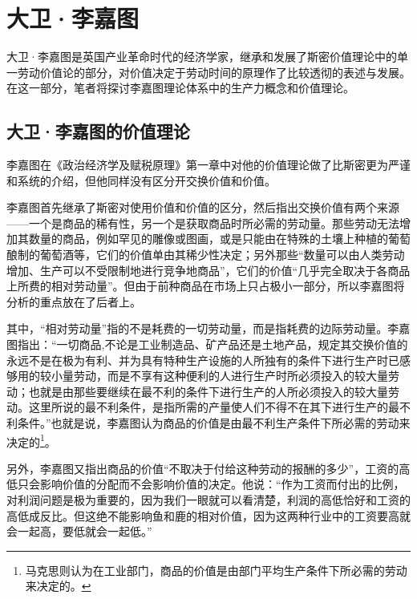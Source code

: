 \section{大卫·李嘉图}

大卫·李嘉图是英国产业革命时代的经济学家，继承和发展了斯密价值理论中的单一劳动价值论的部分，对价值决定于劳动时间的原理作了比较透彻的表述与发展\cite[iv]{DaWei*LiJiaTuZhengZhiJingJiXueJiFuShuiYuanLi2021}。在这一部分，笔者将探讨李嘉图理论体系中的生产力概念和价值理论。

\subsection{大卫·李嘉图的价值理论}

李嘉图在《政治经济学及赋税原理》第一章中对他的价值理论做了比斯密更为严谨和系统的介绍，但他同样没有区分开交换价值和价值。

李嘉图首先继承了斯密对使用价值和价值的区分，然后指出交换价值有两个来源——一个是商品的稀有性，另一个是获取商品时所必需的劳动量\cite[5-6]{DaWei*LiJiaTuZhengZhiJingJiXueJiFuShuiYuanLi2021}。那些劳动无法增加其数量的商品，例如罕见的雕像或图画，或是只能由在特殊的土壤上种植的葡萄酿制的葡萄酒等，它们的价值单由其稀少性决定；另外那些“数量可以由人类劳动增加、生产可以不受限制地进行竞争地商品”，它们的价值“几乎完全取决于各商品上所费的相对劳动量”。\cite[6]{DaWei*LiJiaTuZhengZhiJingJiXueJiFuShuiYuanLi2021}但由于前种商品在市场上只占极小一部分，所以李嘉图将分析的重点放在了后者上。

其中，“相对劳动量”指的不是耗费的一切劳动量，而是指耗费的边际劳动量\cite[16]{LiRenJunJieZhiLiLun2004}。李嘉图指出：“一切商品,不论是工业制造品、矿产品还是土地产品，规定其交换价值的永远不是在极为有利、并为具有特种生产设施的人所独有的条件下进行生产时已感够用的较小量劳动，而是不享有这种便利的人进行生产时所必须投入的较大量劳动；也就是由那些要继续在最不利的条件下进行生产的人所必须投入的较大量劳动。这里所说的最不利条件，是指所需的产量使人们不得不在其下进行生产的最不利条件。”\cite[58]{DaWei*LiJiaTuZhengZhiJingJiXueJiFuShuiYuanLi2021}也就是说，李嘉图认为商品的价值是由最不利生产条件下所必需的劳动来决定的\footnote{马克思则认为在工业部门，商品的价值是由部门平均生产条件下所必需的劳动来决定的\cite[16]{LiRenJunJieZhiLiLun2004}。}。

另外，李嘉图又指出商品的价值“不取决于付给这种劳动的报酬的多少”\cite[5]{DaWei*LiJiaTuZhengZhiJingJiXueJiFuShuiYuanLi2021}，工资的高低只会影响价值的分配而不会影响价值的决定。他说：“作为工资而付出的比例，对利润问题是极为重要的，因为我们一眼就可以看清楚，利润的高低恰好和工资的高低成反比。但这绝不能影响鱼和鹿的相对价值，因为这两种行业中的工资要高就会一起高，要低就会一起低。”\cite[19]{DaWei*LiJiaTuZhengZhiJingJiXueJiFuShuiYuanLi2021}

